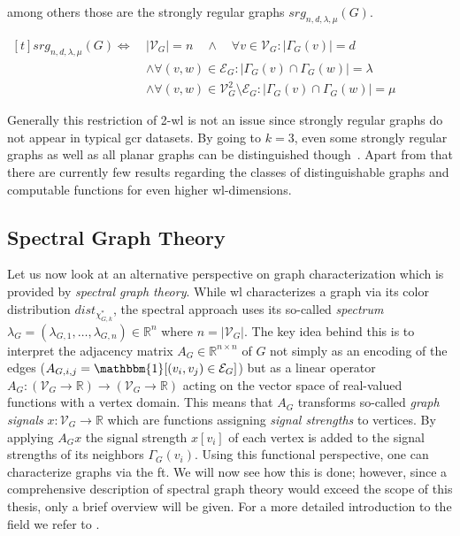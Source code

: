 among others those are the strongly regular graphs $\mathit{srg}_{n, d, \lambda, \mu}(G)$.
\begin{defn}
	$\begin{aligned}[t]
		\mathit{srg}_{n, d, \lambda, \mu}(G) \iff\ & {|\mathcal{V}_G|} = n \quad\land\quad \forall v \in \mathcal{V}_G: {|\Gamma_G(v)|} = d \\
		&\land \forall (v, w) \in \mathcal{E}_G: {|\Gamma_G(v) \cap \Gamma_G(w)|} = \lambda \\
		&\land \forall (v, w) \in \mathcal{V}_G^2 \setminus \mathcal{E}_G: {|\Gamma_G(v) \cap \Gamma_G(w)|} = \mu
	\end{aligned}$
\end{defn}
Generally this restriction of 2-\acs{wl} is not an issue since strongly regular graphs do not appear in typical \ac{gcr} datasets.
By going to $k = 3$, even some strongly regular graphs as well as all planar graphs can be distinguished though~\cite{Kiefer2017}.
Apart from that there are currently few results regarding the classes of distinguishable graphs and computable functions for even higher \ac{wl}-dimensions.

\subsection{Spectral Graph Theory}%
\label{sec:related:character:spectral}

Let us now look at an alternative perspective on graph characterization which is provided by \textit{spectral graph theory}.
While \ac{wl} characterizes a graph via its color distribution $\mathit{dist}_{\chi_{G,k}^{*}}$, the spectral approach uses its so-called \textit{spectrum} $\lambda_G = (\lambda_{G, 1}, \dots, \lambda_{G, n}) \in \mathbb{R}^n$ where $n = |\mathcal{V}_G|$.
The key idea behind this is to interpret the adjacency matrix $A_G \in \mathbb{R}^{n \times n}$ of $G$ not simply as an encoding of the edges ($A_{G,i,j} = \mathbbm{1}[(v_i, v_j) \in \mathcal{E}_G]$) but as a linear operator $A_G: (\mathcal{V}_G \to \mathbb{R}) \to (\mathcal{V}_G \to \mathbb{R})$ acting on the vector space of real-valued functions with a vertex domain.
This means that $A_G$ transforms so-called \textit{graph signals} $x: \mathcal{V}_G \to \mathbb{R}$ which are functions assigning \textit{signal strengths} to vertices.
By applying $A_G x$ the signal strength $x[v_i]$ of each vertex is added to the signal strengths of its neighbors $\Gamma_G(v_i)$.
Using this functional perspective, one can characterize graphs via the \acf{ft}.
We will now see how this is done;
however, since a comprehensive description of spectral graph theory would exceed the scope of this thesis, only a brief overview will be given.
For a more detailed introduction to the field we refer to \citet{Shuman2013}.

